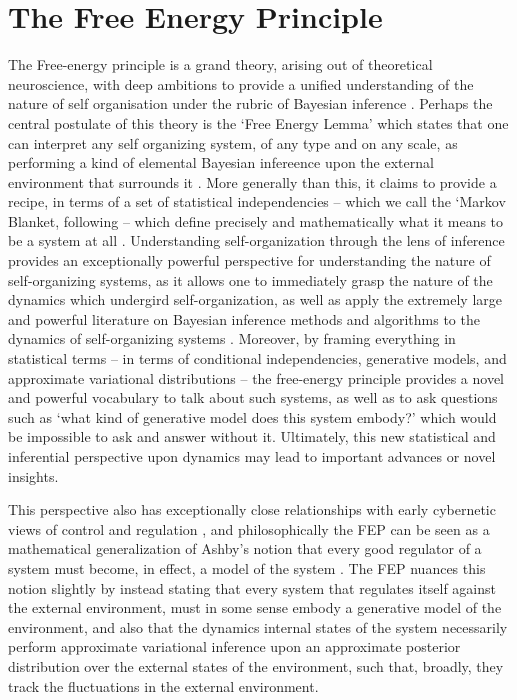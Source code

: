 
\chapter{The Free Energy Principle}

The Free-energy principle is a grand theory, arising out of theoretical neuroscience, with deep ambitions to provide a unified understanding of the nature of self organisation under the rubric of Bayesian inference \citep{friston2006free,friston_free_2019,friston2010free,friston2012free}. Perhaps the central postulate of this theory is the `Free Energy Lemma' which states that one can interpret any self organizing system, of any type and on any scale, as performing a kind of elemental Bayesian infereence upon the external environment that surrounds it \citep{friston2013life,friston2012ao,friston2019particularphysics}. More generally than this, it claims to provide a recipe, in terms of a set of statistical independencies -- which we call the `Markov Blanket, following \citep{pearl2011bayesian} -- which  define precisely and mathematically what it means to be a system at all \citep{friston2019particularphysics}. Understanding self-organization through the lens of inference provides an exceptionally powerful perspective for understanding the nature of self-organizing systems, as it allows one to immediately grasp the nature of the dynamics which undergird self-organization, as well as apply the extremely large and powerful literature on Bayesian inference methods and algorithms to the dynamics of self-organizing systems \citep{parr2020modules,parr2020markov,yedidia2011message}. 
Moreover, by framing everything in statistical terms -- in terms of conditional independencies, generative models, and approximate variational distributions -- the free-energy principle provides a novel and powerful vocabulary to talk about such systems, as well as to ask questions such as `what kind of generative model does this system embody?' \citep{baltieri2020predictions} which would be impossible to ask and answer without it. Ultimately, this new statistical and inferential perspective upon dynamics may lead to important advances or novel insights.

This perspective also has exceptionally close relationships with early cybernetic views of control and regulation \citep{wiener2019cybernetics,conant1970every,kalman1960new}, and philosophically the FEP can be seen as a mathematical generalization of Ashby's notion that every good regulator of a system must become, in effect, a model of the system \citep{conant1970every}. The FEP nuances this notion slightly by instead stating that every system that regulates itself against the external environment, must in some sense embody a generative model of the environment, and also that the dynamics internal states of the system necessarily perform approximate variational inference upon an approximate posterior distribution over the external states of the environment, such that, broadly, they track the fluctuations in the external environment.

